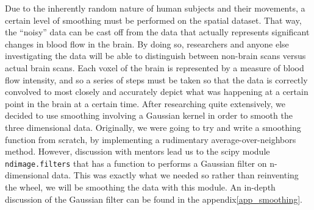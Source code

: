 \par \indent Due to the inherently random nature of human subjects and their 
movements, a certain level of smoothing must be performed on the spatial 
dataset. That way, the ``noisy'' data can be cast off from the data that 
actually represents significant changes in blood flow in the brain. By doing 
so, researchers and anyone else investigating the data will be able to 
distinguish between non-brain scans versus actual brain scans. Each voxel of 
the brain is represented by a measure of blood flow intensity, and so a 
series of steps must be taken so that the data is correctly convolved to most 
closely and accurately depict what was happening at a certain point in the 
brain at a certain time. After researching quite extensively, we decided to 
use smoothing involving a Gaussian kernel in order to smooth the three 
dimensional data. Originally, we were going to try and write a smoothing 
function from scratch, by implementing a rudimentary average-over-neighbors 
method. However, discussion with mentors lead us to the scipy module 
\texttt{ndimage.filters} that has a function to performs a Gaussian filter on 
n-dimensional data. This was exactly what we needed so rather than reinventing 
the wheel, we will be smoothing the data with this module. An in-depth 
discussion of the Gaussian filter can be found in the appendix\ref{app_smoothing}. 
